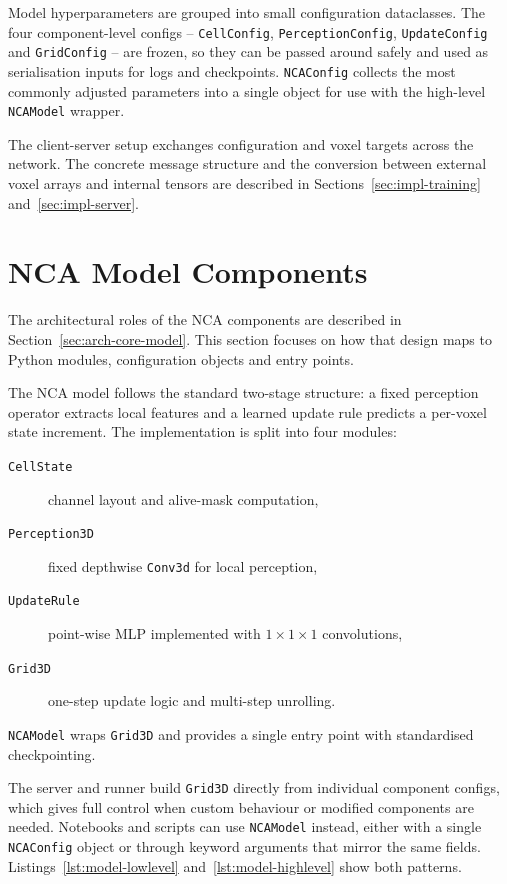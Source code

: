 Model hyperparameters are grouped into small configuration dataclasses.
The four component-level configs -- \texttt{CellConfig},
\texttt{Perception\allowbreak Config}, \texttt{Update\allowbreak Config} and
\texttt{Grid\allowbreak Config} --
are frozen, so they can be passed around safely and used as serialisation
inputs for logs and checkpoints. \texttt{NCAConfig} collects the most commonly
adjusted parameters into a single object for use with the high-level
\texttt{NCAModel} wrapper.

The client-server setup exchanges configuration and voxel targets across the
network. The concrete message structure and the conversion between external
voxel arrays and internal tensors are described in
Sections~\ref{sec:impl-training} and~\ref{sec:impl-server}.

\section{NCA Model Components}

The architectural roles of the NCA components are described in
Section~\ref{sec:arch-core-model}. This section focuses on how that design
maps to Python modules, configuration objects and entry points.

The NCA model follows the standard two-stage structure: a fixed perception
operator extracts local features and a learned update rule predicts a
per-voxel state increment. The implementation is split into four modules:

\begin{description}
    \item[\texttt{CellState}] channel layout and alive-mask computation,
    \item[\texttt{Perception3D}] fixed depthwise \texttt{Conv3d} for local
          perception,
    \item[\texttt{UpdateRule}] point-wise MLP implemented with
          $1{\times}1{\times}1$ convolutions,
    \item[\texttt{Grid3D}] one-step update logic and multi-step unrolling.
\end{description}

\texttt{NCAModel} wraps \texttt{Grid3D} and provides a single entry point
with standardised checkpointing.

The server and runner build \texttt{Grid3D} directly from individual component
configs, which gives full control when custom behaviour or modified components
are needed. Notebooks and scripts can use \texttt{NCAModel} instead, either
with a single \texttt{NCAConfig} object or through keyword arguments that
mirror the same fields. Listings~\ref{lst:model-lowlevel}
and~\ref{lst:model-highlevel} show both patterns.

